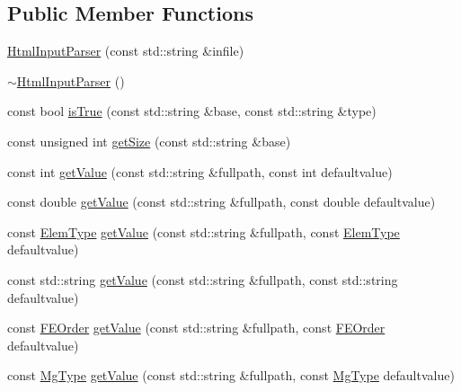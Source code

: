 \subsection*{Public Member Functions}
\begin{DoxyCompactItemize}
\item 
\mbox{\hyperlink{classfemus_1_1_html_input_parser_a54c0e5a9bc28af9bb1b6a8a8500871d4}{Html\+Input\+Parser}} (const std\+::string \&infile)
\item 
\mbox{\hyperlink{classfemus_1_1_html_input_parser_a724b679102f42f026db82897bd1b6e00}{$\sim$\+Html\+Input\+Parser}} ()
\item 
const bool \mbox{\hyperlink{classfemus_1_1_html_input_parser_a53172b90136c6131ad3c97a92f3cf29a}{is\+True}} (const std\+::string \&base, const std\+::string \&type)
\item 
const unsigned int \mbox{\hyperlink{classfemus_1_1_html_input_parser_ae9780db87b1b85ebb52f56f7033c459a}{get\+Size}} (const std\+::string \&base)
\item 
const int \mbox{\hyperlink{classfemus_1_1_html_input_parser_a7c0f0684f37a1c09030a96051260249f}{get\+Value}} (const std\+::string \&fullpath, const int defaultvalue)
\item 
const double \mbox{\hyperlink{classfemus_1_1_html_input_parser_aec006b4a50b3e9d7805483672015b140}{get\+Value}} (const std\+::string \&fullpath, const double defaultvalue)
\item 
const \mbox{\hyperlink{_elem_type_enum_8hpp_a1b014294b9757a001707c979e2bab627}{Elem\+Type}} \mbox{\hyperlink{classfemus_1_1_html_input_parser_a64208f42950a39ffe4bdf458af9e2c67}{get\+Value}} (const std\+::string \&fullpath, const \mbox{\hyperlink{_elem_type_enum_8hpp_a1b014294b9757a001707c979e2bab627}{Elem\+Type}} defaultvalue)
\item 
const std\+::string \mbox{\hyperlink{classfemus_1_1_html_input_parser_ac2df186f98b11d4ccbb0ec2ff4915c86}{get\+Value}} (const std\+::string \&fullpath, const std\+::string defaultvalue)
\item 
const \mbox{\hyperlink{_f_elem_type_enum_8hpp_a00ea9562f0dbb25e22bb3297d596e3ba}{F\+E\+Order}} \mbox{\hyperlink{classfemus_1_1_html_input_parser_acbb5375b2cf0e05e663da942ce78496e}{get\+Value}} (const std\+::string \&fullpath, const \mbox{\hyperlink{_f_elem_type_enum_8hpp_a00ea9562f0dbb25e22bb3297d596e3ba}{F\+E\+Order}} defaultvalue)
\item 
const \mbox{\hyperlink{_mg_type_enum_8hpp_a35aafc39068a269f658aac64338aa781}{Mg\+Type}} \mbox{\hyperlink{classfemus_1_1_html_input_parser_aad4f0541fa07993859ea2bc740b76aaa}{get\+Value}} (const std\+::string \&fullpath, const \mbox{\hyperlink{_mg_type_enum_8hpp_a35aafc39068a269f658aac64338aa781}{Mg\+Type}} defaultvalue)

\end{DoxyCompactItemize}
